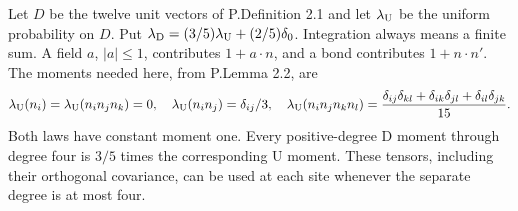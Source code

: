 \begin{htdef}\label{ht:laws}
Let \(D\) be the twelve unit vectors of P.Definition 2.1 and let
\(\lambda_{\mathrm U}\) be the uniform probability on \(D\). Put
\(\lambda_{\mathrm D}=(3/5)\lambda_{\mathrm U}+(2/5)\delta_0\).
Integration always means a finite sum. A field \(a\), \(|a|\le1\),
contributes \(1+a\cdot n\), and a bond contributes \(1+n\cdot n'\).
The moments needed here, from P.Lemma 2.2, are
\begin{equation}\label{ht:moments}
 \lambda_{\mathrm U}(n_i)=\lambda_{\mathrm U}(n_in_jn_k)=0,\quad
 \lambda_{\mathrm U}(n_in_j)=\delta_{ij}/3,\quad
 \lambda_{\mathrm U}(n_in_jn_kn_l)
 =\frac{\delta_{ij}\delta_{kl}+\delta_{ik}\delta_{jl}
                +\delta_{il}\delta_{jk}}{15}.
\end{equation}
Both laws have constant moment one. Every positive-degree D moment
through degree four is \(3/5\) times the corresponding U moment.
These tensors, including their orthogonal covariance, can be used at
each site whenever the separate degree is at most four.
\end{htdef}

